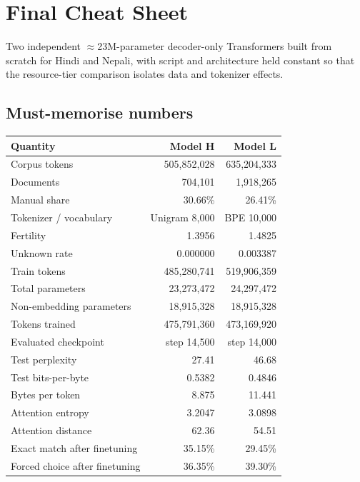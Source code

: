 \documentclass[11pt]{report}
\begin{document}
\appendix
\chapter{Final Cheat Sheet}

\begin{tcolorbox}[colback=titlenavy!7,colframe=titlenavy,
  title={\textbf{The project in one sentence}}]
Two independent ${\approx}$23M-parameter decoder-only Transformers built from
scratch for Hindi and Nepali, with script and architecture held constant so that
the resource-tier comparison isolates data and tokenizer effects.
\end{tcolorbox}

\section{Must-memorise numbers}

\begin{center}\small
\begin{tabular}{lrr}
\toprule
\textbf{Quantity} & \textbf{Model H} & \textbf{Model L} \\
\midrule
Corpus tokens & 505,852,028 & 635,204,333 \\
Documents & 704,101 & 1,918,265 \\
Manual share & 30.66\% & 26.41\% \\
Tokenizer / vocabulary & Unigram 8,000 & BPE 10,000 \\
Fertility & 1.3956 & 1.4825 \\
Unknown rate & 0.000000 & 0.003387 \\
Train tokens & 485,280,741 & 519,906,359 \\
Total parameters & 23,273,472 & 24,297,472 \\
Non-embedding parameters & 18,915,328 & 18,915,328 \\
Tokens trained & 475,791,360 & 473,169,920 \\
Evaluated checkpoint & step 14,500 & step 14,000 \\
Test perplexity & 27.41 & 46.68 \\
Test bits-per-byte & 0.5382 & 0.4846 \\
Bytes per token & 8.875 & 11.441 \\
Attention entropy & 3.2047 & 3.0898 \\
Attention distance & 62.36 & 54.51 \\
Exact match after finetuning & 35.15\% & 29.45\% \\
Forced choice after finetuning & 36.35\% & 39.30\% \\
\bottomrule
\end{tabular}
\end{center}
\end{document}
